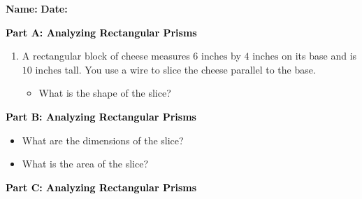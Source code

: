 \documentclass[12pt, letterpaper, fleqn]{article}
\newcommand{\blank}{\underline{\hspace{2.2cm}}}
\begin{document}
\textbf{Name:} \underline{\hspace{5cm}}
\hfill
\textbf{Date:} \underline{\hspace{3cm}}\\

\begin{tcolorbox}[colback=customteal!20]
\large\textcolor{black}{\textbf{Part A: Analyzing Rectangular Prisms}}
\end{tcolorbox}

\vspace{3mm}

\begin{enumerate}[itemsep=4.2cm, leftmargin=0.6cm]
\item A rectangular block of cheese measures $6\text{ inches}$ by $4\text{ inches}$ on its base and is $10\text{ inches}$ tall. You use a wire to slice the cheese parallel to the base. 
\begin{itemize}
\item What is the shape of the slice? \blank
\end{itemize}
\end{enumerate}

\newpage

\begin{tcolorbox}[colback=customteal!20]
\large\textcolor{black}{\textbf{Part B: Analyzing Rectangular Prisms}}
\end{tcolorbox}

\vspace{3mm}

\begin{enumerate}[itemsep=4.2cm, leftmargin=0.6cm, resume]
\begin{itemize}
\item What are the dimensions of the slice? \blank
\item What is the area of the slice? \blank
\end{itemize}
\end{enumerate}

\newpage

\begin{tcolorbox}[colback=customteal!20]
\large\textcolor{black}{\textbf{Part C: Analyzing Rectangular Prisms}}
\end{tcolorbox}

\vspace{3mm}
\end{document}
